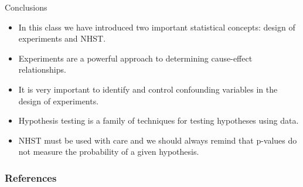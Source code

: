 \documentclass[handout]{beamer}
\begin{document}
\begin{frame}{Conclusions}
 \scriptsize{

\begin{itemize}
 \item  In this class we have introduced two important statistical concepts: design of experiments and NHST.  
 \item Experiments are a powerful approach to determining cause-effect relationships.
 \item It is very important to identify and control confounding variables in the design of experiments.
 \item Hypothesis testing is a family of techniques for testing hypotheses using data.
 \item NHST must be used with care and we should always remind that p-values do not measure the probability of a given hypothesis.
\end{itemize}


}
\end{frame}




\begin{frame}[allowframebreaks]\scriptsize
\frametitle{References}


%
\end{frame}  









\end{document}
